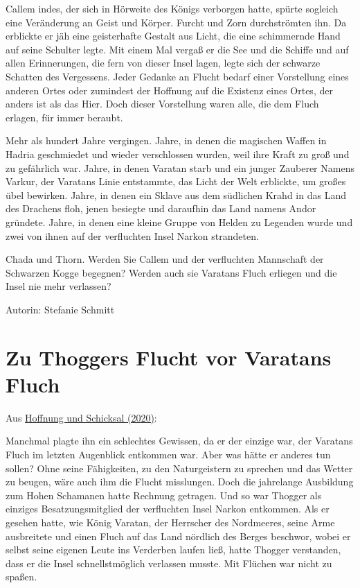 \documentclass[10pt, a4paper, oneside]{book}
\newcommand{\refstorytext}[1]{\hyperref[Storytext: #1]{#1}}
\begin{document}
\begin{multicols}{2}
Callem indes, der sich in Hörweite des Königs verborgen hatte, spürte sogleich eine Veränderung an Geist und Körper. Furcht und Zorn durchströmten ihn. Da erblickte er jäh eine geisterhafte Gestalt aus Licht, die eine schimmernde Hand auf seine Schulter legte. Mit einem Mal vergaß er die See und die Schiffe und auf allen Erinnerungen, die fern von dieser Insel lagen, legte sich der schwarze Schatten des Vergessens. Jeder Gedanke an Flucht bedarf einer Vorstellung eines anderen Ortes oder zumindest der Hoffnung auf die Existenz eines Ortes, der anders ist als das Hier. Doch dieser Vorstellung waren alle, die dem Fluch erlagen, für immer beraubt.\bigskip

Mehr als hundert Jahre vergingen. Jahre, in denen die magischen Waffen in Hadria geschmiedet und wieder verschlossen wurden, weil ihre Kraft zu groß und zu gefährlich war. Jahre, in denen Varatan starb und ein junger Zauberer Namens Varkur, der Varatans Linie entstammte, das Licht der Welt erblickte, um großes übel bewirken. Jahre, in denen ein Sklave aus dem südlichen Krahd in das Land des Drachens floh,  jenen besiegte und daraufhin das Land namens Andor gründete. Jahre, in denen eine kleine Gruppe von Helden zu Legenden wurde und zwei von ihnen auf der verfluchten Insel Narkon strandeten.\bigskip

Chada und Thorn. Werden Sie Callem und der verfluchten Mannschaft der Schwarzen Kogge begegnen? Werden auch sie Varatans Fluch erliegen und die Insel nie mehr verlassen?\bigskip

Autorin: Stefanie Schmitt



\section{Zu Thoggers Flucht vor Varatans Fluch}

\begin{center}
    Aus \refstorytext{Hoffnung und Schicksal (2020)}:
\end{center}

Manchmal plagte ihn ein schlechtes Gewissen, da er der einzige war, der Varatans Fluch im letzten Augenblick entkommen war. Aber was hätte er anderes tun sollen? Ohne seine Fähigkeiten, zu den Naturgeistern zu sprechen und das Wetter zu beugen, wäre auch ihm die Flucht misslungen. Doch die jahrelange Ausbildung zum Hohen Schamanen hatte Rechnung getragen. Und so war Thogger als einziges Besatzungsmitglied der verfluchten Insel Narkon entkommen. Als er gesehen hatte, wie König Varatan, der Herrscher des Nordmeeres, seine Arme ausbreitete und einen Fluch auf das Land nördlich des Berges beschwor, wobei er selbst seine eigenen Leute ins Verderben laufen ließ, hatte Thogger verstanden, dass er die Insel schnellstmöglich verlassen musste. Mit Flüchen war nicht zu spaßen.\bigskip


\end{multicols}
\end{document}
